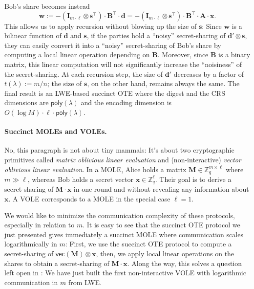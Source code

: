 \documentclass{article}
\newcommand{\Z}{\mathbb{Z}}
\newcommand{\poly}{\mathsf{poly}}
\renewcommand{\sec}{\ensuremath{\lambda}}
\newcommand{\id}{\ensuremath{\mathbf{I}}}
\begin{document}
Bob's share becomes instead
\[\mathbf{w}:=-(\id_{m\cdot \ell}\otimes \mathbf{s}^\intercal) \cdot \mathbf{B}^\intercal\cdot \mathbf{d}=-(\id_{m\cdot \ell}\otimes \mathbf{s}^\intercal) \cdot \mathbf{B}^\intercal\cdot\mathbf{A}\cdot \mathbf{x}.\]
This allows us to apply recursion without blowing up the size of $\mathbf{s}$: Since $\mathbf{w}$ is a bilinear function of $\mathbf{d}$ and $\mathbf{s}$, if the parties hold a ``noisy'' secret-sharing of $\mathbf{d}'\otimes \mathbf{s}$, they can easily convert it into a ``noisy'' secret-sharing of Bob's share by computing a local linear operation depending on $\mathbf{B}$. Moreover, since $\mathbf{B}$ is a binary matrix, this linear computation will not significantly increase the ``noisiness'' of the secret-sharing. At each recursion step, the size of $\mathbf{d}'$ decreases by a factor of $t(\sec):=m/n$; the size of $\mathbf{s}$, on the other hand, remains always the same. The final result is an LWE-based succinct OTE where the digest and the CRS dimensions are $\poly(\sec)$ and the encoding dimension is $O(\log M)\cdot \ell\cdot \poly(\sec)$. 

\paragraph{Succinct MOLEs and VOLEs.} No, this paragraph is not about tiny mammals: It's about two cryptographic primitives called \emph{matrix oblivious linear evaluation} and (non-interactive) \emph{vector oblivious linear evaluation}. In a MOLE, Alice holds a matrix $\mathbf{M}\in\Z_q^{m\times \ell}$ where $m\gg \ell$, whereas Bob holds a secret vector $\mathbf{x}\in\Z_q^\ell$. Their goal is to derive a secret-sharing of $\mathbf{M}\cdot \mathbf{x}$ in one round and without revealing any information about $\mathbf{x}$. A VOLE corresponds to a MOLE in the special case $\ell=1$. 

We would like to minimize the communication complexity of these protocols, especially in relation to $m$. It is easy to see that the succinct OTE protocol we just presented gives immediately a succinct MOLE where communication scales logarithmically in $m$: First, we use the succinct OTE protocol to compute a secret-sharing of $\mathsf{vec}(\mathbf{M})\otimes \mathbf{x}$, then, we apply local linear operations on the shares to obtain a secret-sharing of $\mathbf{M}\cdot \mathbf{x}$. Along the way, this solves a question left open in \cite{EC:AbrRoySch24}: We have just built the first non-interactive VOLE with logarithmic communication in $m$ from LWE.
\end{document}
